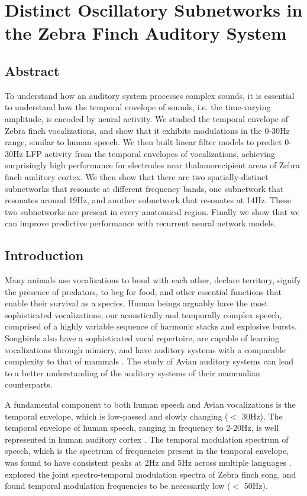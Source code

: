 \chapter{Distinct Oscillatory Subnetworks in the Zebra Finch Auditory System}

\section{Abstract}
To understand how an auditory system processes complex sounds, it is essential to understand how the temporal envelope of sounds, i.e. the time-varying amplitude, is encoded by neural activity. We studied the temporal envelope of Zebra finch vocalizations, and show that it exhibits modulations in the 0-30Hz range, similar to human speech. We then built linear filter models to predict 0-30Hz LFP activity from the temporal envelopes of vocalizations, achieving surprisingly high performance for electrodes near thalamorecipient areas of Zebra finch auditory cortex. We then show that there are two spatially-distinct subnetworks that resonate at different frequency bands, one subnetwork that resonates around 19Hz, and another subnetwork that resonates at 14Hz. These two subnetworks are present in every anatomical region. Finally we show that we can improve predictive performance with recurrent neural network models.

\section{Introduction}

Many animals use vocalizations to bond with each other, declare territory, signify the presence of predators, to beg for food, and other essential functions that enable their survival as a species. Human beings arguably have the most sophisticated vocalizations, our acoustically and temporally complex speech, comprised of a highly variable sequence of harmonic stacks and explosive bursts. Songbirds also have a sophisticated vocal repertoire, are capable of learning vocalizations through mimicry, and have auditory systems with a comparable complexity to that of mammals \cite{Brainard2013}. The study of Avian auditory systems can lead to a better understanding of the auditory systems of their mammalian counterparts.

A fundamental component to both human speech and Avian vocalizations is the temporal envelope, which is low-passed and slowly changing ($<$ 30Hz). The temporal envelope of human speech, ranging in frequency to 2-20Hz, is well represented in human auditory cortex \cite{Aiken2008}. The temporal modulation spectrum of speech, which is the spectrum of frequencies present in the temporal envelope, was found to have consistent peaks at 2Hz and 5Hz across multiple languages \cite{Ding2016}. \cite{Singh2003} explored the joint spectro-temporal modulation spectra of Zebra finch song, and found temporal modulation frequencies to be necessarily low ($<$ 50Hz).

